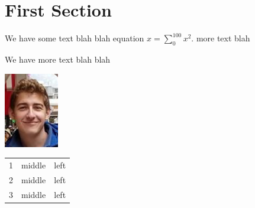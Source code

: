 \documentclass{article}
\begin{document}
	\section{First Section}
	
	We have some text blah blah equation $x = \sum_{0}^{100} x^2$. more text blah
	
	We have more text blah blah

	\includegraphics{images/joff.png}
	
	\begin{tabular}{ccl}
		1 & middle & left \\
		2 & middle & left \\
		3 & middle & left
	\end{tabular}
\end{document}
